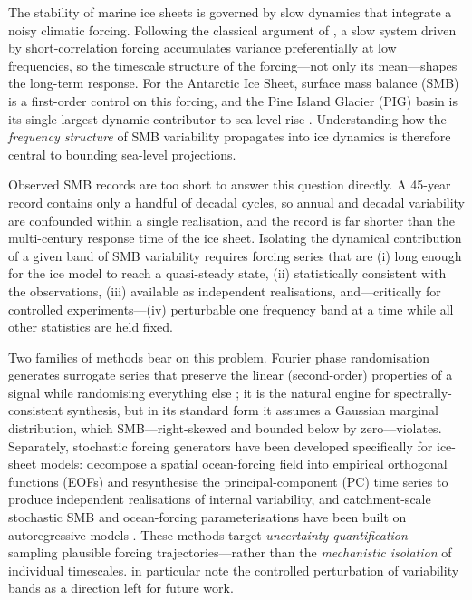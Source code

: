 \introduction

The stability of marine ice sheets is governed by slow dynamics that
integrate a noisy climatic forcing. Following the classical argument of
\citet{hasselmann1976}, a slow system driven by short-correlation
forcing accumulates variance preferentially at low frequencies, so the
timescale structure of the forcing---not only its mean---shapes the
long-term response. For the Antarctic Ice Sheet, surface mass balance
(SMB) is a first-order control on this forcing, and the Pine Island
Glacier (PIG) basin is its single largest dynamic contributor to sea-level
rise \citep{rignot2019}. Understanding how the \emph{frequency structure} of
SMB variability propagates into ice dynamics is therefore central to
bounding sea-level projections.

Observed SMB records are too short to answer this question directly. A
45-year record contains only a handful of decadal cycles, so annual and
decadal variability are confounded within a single realisation, and the
record is far shorter than the multi-century response time of the ice
sheet. Isolating the dynamical contribution of a given band of SMB
variability requires forcing series that are (i) long enough for the ice
model to reach a quasi-steady state, (ii) statistically consistent with the
observations, (iii) available as independent realisations, and---critically
for controlled experiments---(iv) perturbable one frequency band at a time
while all other statistics are held fixed.

Two families of methods bear on this problem. Fourier phase randomisation
generates surrogate series that preserve the linear (second-order)
properties of a signal while randomising everything else
\citep{theiler1992,schreiber2000}; it is the natural engine for
spectrally-consistent synthesis, but in its standard form it assumes a
Gaussian marginal distribution, which SMB---right-skewed and bounded below
by zero---violates. Separately, stochastic forcing generators have been
developed specifically for ice-sheet models: \citet{muruganandham2023}
decompose a spatial ocean-forcing field into empirical orthogonal functions
(EOFs) and resynthesise the principal-component (PC) time series to produce
independent realisations of internal variability, and catchment-scale
stochastic SMB and ocean-forcing parameterisations have been built on
autoregressive models \citep[e.g.][]{ultee2024,verjans2023}. These methods
target \emph{uncertainty quantification}---sampling plausible forcing
trajectories---rather than the \emph{mechanistic isolation} of individual
timescales. \citet{muruganandham2023} in particular note the controlled
perturbation of variability bands as a direction left for future work.

